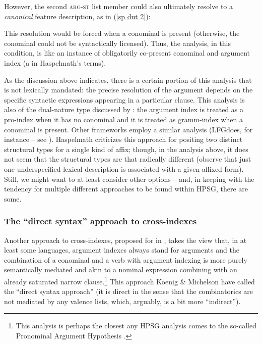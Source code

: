 \documentclass[output=paper
 	        ,biblatex
                ,babelshorthands
                ,newtxmath
                ,draftmode
                ,colorlinks, citecolor=brown
]{langscibook}
\begin{document}
However, the second \textsc{arg-st} list member could also ultimately resolve to a \textit{canonical} feature description, as in (\ref{sp dut 2}):   
%
%
\begin{exe}
\ex\label{sp dut 2}
\end{exe}
%
This resolution would be forced when a conominal is present (otherwise, the conominal could not be syntactically licensed). Thus, the analysis, in this condition, is like an instance of obligatorily co-present conominal and argument index (a  in Haspelmath's terms). 

As the discussion above indicates, there is a certain portion of this analysis that is not lexically mandated: the precise resolution of the argument depends on the specific syntactic expressions appearing in a particular clause. This analysis is also of the dual-nature type discussed by \citet{haspelmath13}: the argument index is treated as a pro-index when it has no conominal and it is treated as gramm-index when a conominal is present. Other frameworks employ a similar analysis (LFG\indexlfg does, for instance -- see \citealt[Chapter~8]{BATW2015a}). Haspelmath criticizes this approach for positing two distinct structural types for a single kind of affix; though, in the analysis above, it does not seem that the structural types are that radically different (observe that just one underspecified lexical description is associated with a given affixed form). Still, we might want to at least consider other options -- and, in keeping with the tendency for multiple different approaches to be found within HPSG, there are some.  

\subsubsection{The ``direct syntax'' approach to cross-indexes}

Another approach to cross-indexes, proposed for  in \citet{KM15}, takes the view that, in at least some languages, argument indexes always stand for arguments and the combination of a conominal and a verb with argument indexing is more purely semantically mediated and akin to a nominal expression combining with an already saturated narrow clause.\footnote{This analysis is perhaps the closest any HPSG analysis comes to the so-called Pronominal Argument Hypothesis \citep{jelinek84}.} This approach Koenig \& Michelson have called the ``direct syntax approach'' (it is direct in the sense that the combinatorics are not mediated by any valence lists, which, arguably, is a bit more ``indirect''). 
\end{document}
